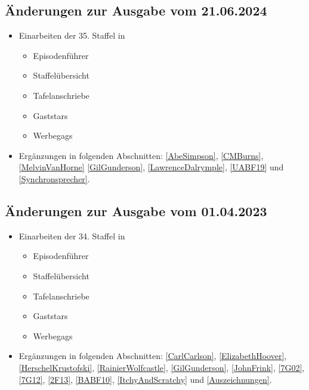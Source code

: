 \documentclass[pagesize,twoside,german]{scrbook}
\begin{document}
\subsection*{Änderungen zur Ausgabe vom 21.06.2024}
\begin{itemize}
	\item Einarbeiten der 35. Staffel in
	\begin{itemize}
		\item Episodenführer
		\item Staffelübersicht
		\item Tafelanschriebe
		\item Gaststars
		\item Werbegags
	\end{itemize}
	\item Ergänzungen in folgenden Abschnitten: \ref{AbeSimpson}, \ref{CMBurns}, \ref{MelvinVanHorne} \ref{GilGunderson}, \ref{LawrenceDalrymple}, \ref{UABF19} und \ref{Synchronsprecher}.
\end{itemize}

\subsection*{Änderungen zur Ausgabe vom 01.04.2023}
\begin{itemize}
	\item Einarbeiten der 34. Staffel in
	\begin{itemize}
		\item Episodenführer
		\item Staffelübersicht
		\item Tafelanschriebe
		\item Gaststars
		\item Werbegags
	\end{itemize}
	\item Ergänzungen in folgenden Abschnitten: \ref{CarlCarlson}, \ref{ElizabethHoover}, \ref{HerschelKrustofski}, \ref{RainierWolfcastle}, \ref{GilGunderson}, \ref{JohnFrink}, \ref{7G02}, \ref{7G12}, \ref{2F13}, \ref{BABF10}, \ref{ItchyAndScratchy} und \ref{Auszeichnungen}.
\end{itemize}
\end{document}
